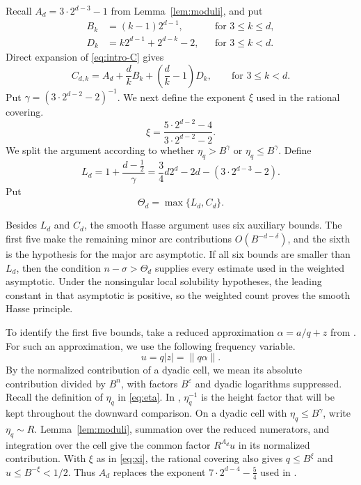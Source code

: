 \documentclass[reqno,a4paper,11pt]{amsart}
\numberwithin{equation}{section}
\newcommand{\eps}{\varepsilon}
\theoremstyle{plain}
\theoremstyle{definition}
\begin{document}
Recall \(A_d=3\cdot2^{d-3}-1\) from Lemma~\ref{lem:moduli}, and put
\[
 \begin{aligned}
 B_k&=(k-1)2^{d-1},
 &&\text{for }3\leq k\leq d,\\
 D_k&=k2^{d-1}+2^{d-k}-2,
 &&\text{for }3\leq k<d.
 \end{aligned}
\]
Direct expansion of \eqref{eq:intro-C} gives
\begin{equation}\label{eq:component-threshold}
 C_{d,k}
 =A_d+\frac dkB_k+\left(\frac dk-1\right)D_k,
 \qquad\text{for }3\leq k<d.
\end{equation}
Put \(\gamma=(3\cdot2^{d-2}-2)^{-1}\).
We next define the exponent \(\xi\) used in the rational covering.
\begin{equation}\label{eq:xi}
 \xi=\frac{5\cdot2^{d-2}-4}{3\cdot2^{d-2}-2}.
\end{equation}
We split the argument according to whether \(\eta_q>B^\gamma\) or \(\eta_q\leq B^\gamma\).
Define
\begin{equation}\label{eq:Ld}
 L_d
 =1+\frac{d-\frac12}{\gamma}
 =\frac34d2^d-2d-\left(3\cdot2^{d-3}-2\right).
\end{equation}
Put
\begin{equation}\label{eq:minor-arc-threshold}
 \Theta_d=\max\{L_d,C_d\}.
\end{equation}

Besides \(L_d\) and \(C_d\), the smooth Hasse argument uses six auxiliary bounds.
The first five make the remaining minor arc contributions \(O(B^{-d-\delta})\), and the sixth is the hypothesis for the major arc asymptotic.
If all six bounds are smaller than \(L_d\), then the condition \(n-\sigma>\Theta_d\) supplies every estimate used in the weighted asymptotic.
Under the nonsingular local solubility hypotheses, the leading constant in that asymptotic is positive, so the weighted count proves the smooth Hasse principle.

To identify the first five bounds, take a reduced approximation \(\alpha=a/q+z\) from \cite[Proof of Lemma~4.2]{bp}.
For such an approximation, we use the following frequency variable.
\begin{equation}\label{eq:minor-frequency}
 u=q|z|=\lVert q\alpha\rVert.
\end{equation}
By the normalized contribution of a dyadic cell, we mean its absolute contribution divided by \(B^n\), with factors \(B^\eps\) and dyadic logarithms suppressed.
Recall the definition of \(\eta_q\) in \eqref{eq:eta}. 
In \cite[Proposition~3.7]{bp}, \(\eta_q^{-1}\) is the height factor that will be kept throughout the downward comparison.
On a dyadic cell with \(\eta_q\leq B^\gamma\), write \(\eta_q\sim R\).
Lemma~\ref{lem:moduli}, summation over the reduced numerators, and integration over the cell give the common factor \(R^{A_d}u\) in its normalized contribution.
With \(\xi\) as in \eqref{eq:xi}, the rational covering also gives \(q\leq B^\xi\) and \(u\leq B^{-\xi}<1/2\).
Thus \(A_d\) replaces the exponent \(7\cdot2^{d-4}-\frac54\) used in \cite[Eq.~(4.2) and Lemma~4.4]{bp}.
\end{document}
